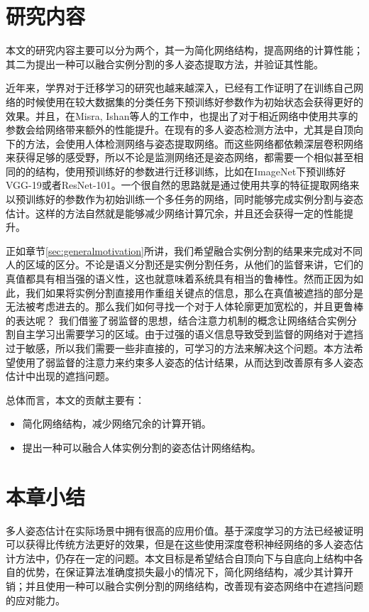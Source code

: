 \section{研究内容}
\label{sec:generalfield}
本文的研究内容主要可以分为两个，其一为简化网络结构，提高网络的计算性能；其二为提出一种可以融合实例分割的多人姿态提取方法，并验证其性能。

近年来，学界对于迁移学习的研究也越来越深入，已经有工作证明了在训练自己网络的时候使用在较大数据集的分类任务下预训练好参数作为初始状态会获得更好的效果\cite{mishkin2015all}。并且，在Misra, Ishan等人\cite{misra2016cross}的工作中，也提出了对于相近网络中使用共享的参数会给网络带来额外的性能提升。在现有的多人姿态检测方法中，尤其是自顶向下的方法，会使用人体检测网络与姿态提取网络。而这些网络都依赖深层卷积网络来获得足够的感受野，所以不论是监测网络还是姿态网络，都需要一个相似甚至相同的的结构，使用预训练好的参数进行迁移训练，比如在ImageNet\cite{deng2009imagenet}下预训练好VGG-19\cite{simonyan2014very}或者ResNet-101\cite{He2015Deep}。一个很自然的思路就是通过使用共享的特征提取网络来以预训练好的参数作为初始训练一个多任务的网络，同时能够完成实例分割与姿态估计。这样的方法自然就是能够减少网络计算冗余，并且还会获得一定的性能提升。

正如章节\ref{sec:generalmotivation}所讲，我们希望融合实例分割的结果来完成对不同人的区域的区分。不论是语义分割还是实例分割任务，从他们的监督来讲，它们的真值都具有相当强的语义性，这也就意味着系统具有相当的鲁棒性。然而正因为如此，我们如果将实例分割直接用作重组关键点的信息，那么在真值被遮挡的部分是无法被考虑进去的。那么我们如何寻找一个对于人体轮廓更加宽松的，并且更鲁棒的表达呢？
我们借鉴了弱监督的思想，结合注意力机制的概念让网络结合实例分割自主学习出需要学习的区域。由于过强的语义信息导致受到监督的网络对于遮挡过于敏感，所以我们需要一些非直接的，可学习的方法来解决这个问题。本方法希望使用了弱监督的注意力来约束多人姿态的估计结果，从而达到改善原有多人姿态估计中出现的遮挡问题。

总体而言，本文的贡献主要有：
\begin{itemize}
	\item 简化网络结构，减少网络冗余的计算开销。
	\item 提出一种可以融合人体实例分割的姿态估计网络结构。
\end{itemize}

\section{本章小结}
\label{sec:introconclusion}
多人姿态估计在实际场景中拥有很高的应用价值。基于深度学习的方法已经被证明可以获得比传统方法更好的效果，但是在这些使用深度卷积神经网络的多人姿态估计方法中，仍存在一定的问题。本文目标是希望结合自顶向下与自底向上结构中各自的优势，在保证算法准确度损失最小的情况下，简化网络结构，减少其计算开销；并且使用一种可以融合实例分割的网络结构，改善现有姿态网络中在遮挡问题的应对能力。